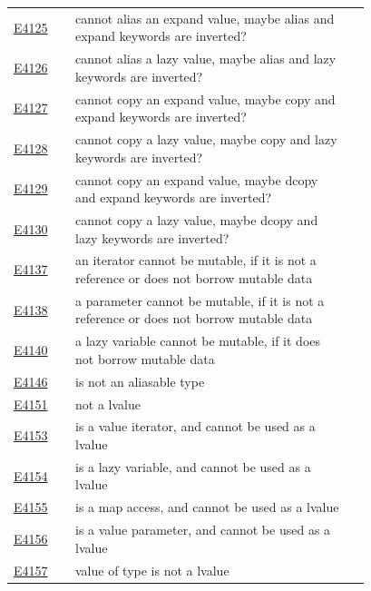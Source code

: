 \begin{longtable}{@{}l p{0.78\linewidth} r@{}}
\hyperref[sec:codes:e4125]{E4125} & cannot alias an expand value, maybe alias and expand keywords are inverted? & \pageref{sec:codes:e4125}\\
\hyperref[sec:codes:e4126]{E4126} & cannot alias a lazy value, maybe alias and lazy keywords are inverted? & \pageref{sec:codes:e4126}\\
\hyperref[sec:codes:e4127]{E4127} & cannot copy an expand value, maybe copy and expand keywords are inverted? & \pageref{sec:codes:e4127}\\
\hyperref[sec:codes:e4128]{E4128} & cannot copy a lazy value, maybe copy and lazy keywords are inverted? & \pageref{sec:codes:e4128}\\
\hyperref[sec:codes:e4129]{E4129} & cannot copy an expand value, maybe dcopy and expand keywords are inverted? & \pageref{sec:codes:e4129}\\
\hyperref[sec:codes:e4130]{E4130} & cannot copy a lazy value, maybe dcopy and lazy keywords are inverted? & \pageref{sec:codes:e4130}\\
\hyperref[sec:codes:e4137]{E4137} & an iterator cannot be mutable, if it is not a reference or does not borrow mutable data & \pageref{sec:codes:e4137}\\
\hyperref[sec:codes:e4138]{E4138} & a parameter cannot be mutable, if it is not a reference or does not borrow mutable data & \pageref{sec:codes:e4138}\\
\hyperref[sec:codes:e4140]{E4140} & a lazy variable cannot be mutable, if it does not borrow mutable data & \pageref{sec:codes:e4140}\\
\hyperref[sec:codes:e4146]{E4146} & \errhole{} is not an aliasable type & \pageref{sec:codes:e4146}\\
\hyperref[sec:codes:e4151]{E4151} & not a lvalue & \pageref{sec:codes:e4151}\\
\hyperref[sec:codes:e4153]{E4153} & \errhole{} is a value iterator, and cannot be used as a lvalue & \pageref{sec:codes:e4153}\\
\hyperref[sec:codes:e4154]{E4154} & \errhole{} is a lazy variable, and cannot be used as a lvalue & \pageref{sec:codes:e4154}\\
\hyperref[sec:codes:e4155]{E4155} & \errhole{} is a map access, and cannot be used as a lvalue & \pageref{sec:codes:e4155}\\
\hyperref[sec:codes:e4156]{E4156} & \errhole{} is a value parameter, and cannot be used as a lvalue & \pageref{sec:codes:e4156}\\
\hyperref[sec:codes:e4157]{E4157} & value of type \errhole{} is not a lvalue & \pageref{sec:codes:e4157}\\

\end{longtable}
